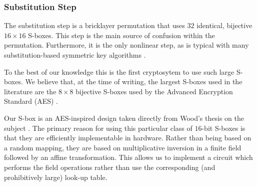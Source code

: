 \subsubsection{Substitution Step}
The substitution step is a bricklayer permutation that uses $32$ identical, bijective $16 \times 16$ S-boxes.
This step is the main source of confusion within the permutation.
Furthermore, it is the only nonlinear step, as is typical with many substitution-based symmetric key algorithms \cite{Stinson2006_CTAP}.

To the best of our knowledge this is the first cryptosytem to use such large S-boxes.
We believe that, at the time of writing, the largest S-boxes used in the literature are the $8 \times 8$ bijective S-boxes used by the Advanced Encryption Standard (AES) \cite{Daemen2002_DesignOfRijndael}\cite{NIST2001_FIPS-197}.

Our S-box is an AES-inspired design taken directly from Wood's thesis on the subject \cite{Wood2013_SboxThesis}.
The primary reason for using this particular class of $16$-bit S-boxes is that they are efficiently implementable in hardware.
Rather than being based on a random mapping, they are based on multiplicative inversion in a finite field followed by an affine transformation.
This allows us to implement a circuit which performs the field operations rather than use the corresponding (and prohibitively large) look-up table.

